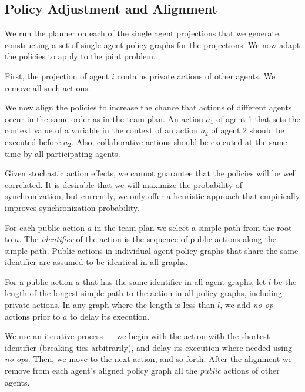 \documentclass[letterpaper]{article}
\theoremstyle{definition}
\begin{document}
\subsection{Policy Adjustment and Alignment}

We run the planner on each of the single agent projections that we generate, constructing a set of single agent policy graphs for the projections. We now adapt the policies to apply to the joint problem. 


First, the projection of agent $i$ contains private actions of other agents. We remove all such actions. %


We now align the policies to increase the chance that actions of different agents occur in the same order as in the team plan. An action $a_1$ of agent 1 that sets the context value of a variable in the context of an action $a_2$ of agent 2 should be executed before $a_2$. Also, collaborative actions should be executed at the same time by all participating agents.  


Given stochastic action effects, we cannot guarantee that the policies will be well correlated. It is desirable that we will maximize the probability of synchronization, but currently, we only offer a heuristic approach that empirically improves synchronization probability. 

For each public action $a$ in the team plan we select a simple path from the root to $a$. The {\em identifier} of the action is the sequence of public actions along the simple path. Public actions in individual agent policy graphs that share the same identifier are assumed to be identical in all graphs.

For a public action $a$ that has the same identifier in all agent graphs, let $l$ be the length of the longest simple path to the action in all policy graphs, including private actions. In any graph where the length is less than $l$, we add {\em no-op} actions prior to $a$ to delay its execution.

We use an iterative process --- we begin with the action with the shortest identifier (breaking ties arbitrarily), and delay its execution where needed using {\em no-op}s. Then, we move to the next action, and so forth.
After the alignment we remove from each agent's aligned policy graph all the {\em public} actions of other agents.
\end{document}
